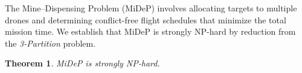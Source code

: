 \documentclass[subscriptcorrection,upint,nolists, varvw,barcolor=Goldenrod3,mathalfa=cal=euler,balance,hyphenate,french]{asmejour} %
\newtheorem{theorem}{Theorem}
\begin{document}






The Mine–Dispensing Problem (MiDeP) involves allocating targets to multiple drones and determining conflict-free flight schedules that minimize the total mission time. 
We establish that MiDeP is strongly NP-hard by reduction from the \emph{3-Partition} problem.

\begin{theorem}
MiDeP is strongly NP-hard.
\end{theorem}
\end{document}
